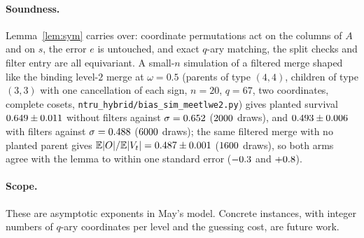 \paragraph{Soundness.} Lemma~\ref{lem:sym} carries over: coordinate permutations act on the columns of $A$ and on $s$,
the error $e$ is untouched, and exact $q$-ary matching, the split checks and filter entry are all equivariant. A
small-$n$ simulation of a filtered merge shaped like the binding level-$2$ merge at $\omega=0.5$ (parents of type
$(4,4)$, children of type $(3,3)$ with one cancellation of each sign, $n=20$, $q=67$, two coordinates, complete
cosets, \texttt{ntru\_hybrid/bias\_sim\_meetlwe2.py}) gives planted survival $0.649\pm0.011$ without filters against
$\sigma=0.652$ ($2000$ draws), and $0.493\pm0.006$ with filters against $\sigma=0.488$
($6000$ draws); the same filtered merge with no planted parent gives $\mathbb{E}|O|/\mathbb{E}|V_t|=0.487\pm0.001$
($1600$ draws), so both arms agree with the lemma to within one standard error ($-0.3$ and $+0.8$).

\paragraph{Scope.} These are asymptotic exponents in May's model. Concrete instances, with integer numbers of
$q$-ary coordinates per level and the guessing cost, are future work.
